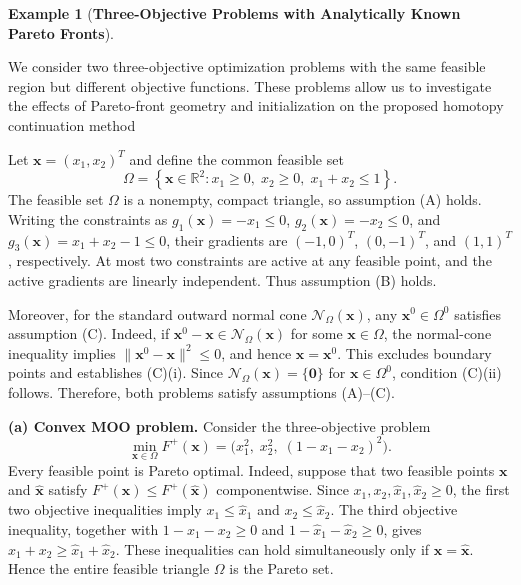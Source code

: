 \documentclass[11pt,pdflatex,sn-mathphys-ay]{sn-jnl}%
\theoremstyle{definition}
\theoremstyle{thmstyleone}%
\theoremstyle{thmstyletwo}%
\newtheorem{example}{Example}%
\theoremstyle{thmstylethree}%
\newcommand{\add}[1]{\textcolor{revisionblue}{#1}}
\begin{document}
	
	
	\begin{example}[\textbf{Three-Objective Problems with Analytically Known Pareto Fronts}]
		\label{EX4}
		
		\add{We consider two three-objective optimization problems with the same
			feasible region but different objective functions. These problems
			allow us to investigate the effects of Pareto-front geometry and
			initialization on the proposed homotopy continuation method}
		
		\add{Let $\bm{x}=(x_1,x_2)^T$ and define the common feasible set
			\begin{equation}
				\label{eq:example4_feasible}
				\Omega=
				\left\{
				\bm{x}\in\mathbb{R}^2:
				x_1\geq0,\;
				x_2\geq0,\;
				x_1+x_2\leq1
				\right\}.
			\end{equation}
			The feasible set $\Omega$ is a nonempty, compact triangle,
			so assumption (A) holds. Writing the constraints as
			$g_1(\bm{x})=-x_1\leq0$,
			$g_2(\bm{x})=-x_2\leq0$, and
			$g_3(\bm{x})=x_1+x_2-1\leq0$, their gradients are
			$(-1,0)^T$, $(0,-1)^T$, and $(1,1)^T$, respectively.
			At most two constraints are active at any feasible point,
			and the active gradients are linearly independent.
			Thus assumption (B) holds.}
		
		\add{Moreover, for the standard outward normal cone
			$\mathcal N_\Omega(\bm{x})$, any
			$\bm{x}^0\in\Omega^0$ satisfies assumption (C).
			Indeed, if
			$\bm{x}^0-\bm{x}\in\mathcal N_\Omega(\bm{x})$
			for some $\bm{x}\in\Omega$, the normal-cone inequality
			implies
			$\|\bm{x}^0-\bm{x}\|^2\leq0$,
			and hence $\bm{x}=\bm{x}^0$.
			This excludes boundary points and establishes
			(C)(i). Since
			$\mathcal N_\Omega(\bm{x})=\{\bm{0}\}$
			for $\bm{x}\in\Omega^0$, condition (C)(ii) follows.
			Therefore, both problems satisfy assumptions
			(A)--(C).}
		
		
		\add{\medskip
			\noindent\textbf{(a) Convex MOO problem.}
			Consider the three-objective problem
			\begin{equation}
				\label{eq:example4_convex}
				\min_{\bm{x}\in\Omega}
				F^+(\bm{x})
				=
				\bigl(x_1^2,\;x_2^2,\;(1-x_1-x_2)^2\bigr).
			\end{equation}
			Every feasible point is Pareto optimal. Indeed, suppose that two
			feasible points $\bm{x}$ and $\widehat{\bm{x}}$ satisfy
			$F^+(\bm{x})\leq F^+(\widehat{\bm{x}})$ componentwise.
			Since $x_1,x_2,\widehat{x}_1,\widehat{x}_2\geq0$, the first two
			objective inequalities imply
			$x_1\leq\widehat{x}_1$ and
			$x_2\leq\widehat{x}_2$.
			The third objective inequality, together with
			$1-x_1-x_2\geq0$ and
			$1-\widehat{x}_1-\widehat{x}_2\geq0$, gives
			$x_1+x_2\geq\widehat{x}_1+\widehat{x}_2$.
			These inequalities can hold simultaneously only if
			$\bm{x}=\widehat{\bm{x}}$. Hence the entire feasible triangle
			$\Omega$ is the Pareto set.}
		

\end{example}
\end{document}

